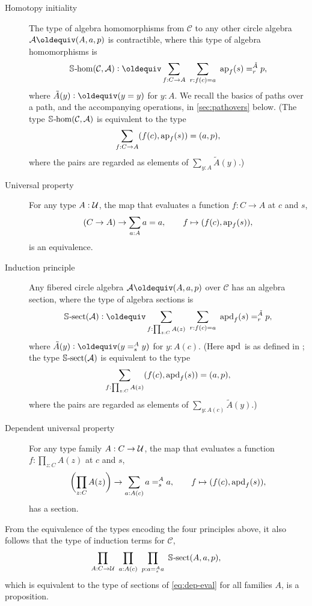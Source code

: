 \documentclass[a4paper,12pt]{amsart}
\begin{document}
\begin{description}
\item[Homotopy initiality]
  The type of algebra homomorphisms
  from $\mathcal C$ to any other circle algebra $\mathcal A\jdeq(A,a,p)$
  is contractible, where this type of algebra homomorphisms is
  \begin{equation}\label{eq:circle-hom}
    \Shom(\mathcal C,\mathcal A) \defeq
    \sum_{f : C \to A}~\sum_{r:f(c)=a}~ \ap{f}(s)=^{\tilde A}_r p,
  \end{equation}
  where $\tilde A(y) \defeq (y=y)$ for $y:A$.
  We recall the basics of paths over a path, and the accompanying
  operations, in \cref{sec:pathovers} below.
  (The type $\mathop{\mathbb{S}\textup{\kern.5pt-\kern-.5pt}\mathrm{hom}}(\mathcal C,\mathcal A)$ is equivalent to the type
  \[
    \sum_{f : C \to A} (f(c),\mathop{{\mathrm{ap}}_{f}}(s)) = (a,p),
  \]
  where the pairs are regarded as elements of $\sum_{y:A} \tilde A(y)$.)
\item[Universal property]
  For any type $A:\mathcal{U}$, the map that evaluates a function $f : C \to A$
  at $c$ and $s$,
  \begin{equation}\label{eq:eval}
    (C \to A) \to \sum_{a : A} a=a,
    \qquad
    f \mapsto (f(c), \mathop{{\mathrm{ap}}_{f}}(s)),
  \end{equation}
  is an equivalence.
\item[Induction principle]
  Any fibered circle algebra $\mathcal A\jdeq (A,a,p)$
  over $\mathcal C$ has an algebra section,
  where the type of algebra sections is
  \begin{equation}\label{eq:circle-sect}
    \Ssect(\mathcal A) \defeq
    \sum_{f: \prod_{z:C} A(z)}~
    \sum_{r: f(c) = a}~
    \apd{f}(s) =^{\tilde A}_r p,
  \end{equation}
  where $\tilde A(y) \defeq (y =^A_s y)$ for $y:A(c)$.
  (Here $\mathop{{\mathrm{apd}}_{}}$ is as defined in \cite[2.3]{hottbook};
  the type $\mathop{\mathbb{S}\textup{\kern.5pt-\kern-.5pt}\mathrm{sect}}(\mathcal A)$ is equivalent to the type
  \[
    \sum_{f: \prod_{z:C} A(z)} (f(c),\mathop{{\mathrm{apd}}_{f}}(s)) = (a,p),
  \]
  where the pairs are regarded as elements of $\sum_{y:A(c)}\tilde A(y)$.)
\item[Dependent universal property]
  For any type family $A : C \to \mathcal{U}$, the map that evaluates a function
  $f : \prod_{z:C} A(z)$ at $c$ and $s$,
  \begin{equation}\label{eq:dep-eval}
    \biggl(\prod_{z:C} A(z)\biggr) \to \sum_{a:A(c)} a=^A_s a,
    \qquad
    f \mapsto (f(c), \mathop{{\mathrm{apd}}_{f}}(s)),
  \end{equation}
  has a section.
\end{description}
From the equivalence of the types encoding the four principles above,
it also follows that the type of induction terms
for $\mathcal C$,
\begin{equation}
  \label{eq:circle-induction-gen}
  \prod_{A: C\to\mathcal{U}}~
  \prod_{a: A(c)}~
  \prod_{p: a=^A_s a}~
  \mathop{\mathbb{S}\textup{\kern.5pt-\kern-.5pt}\mathrm{sect}}(A,a,p),
\end{equation}
which is equivalent to the type of sections of \eqref{eq:dep-eval}
for all families $A$, is a proposition.
\end{document}
